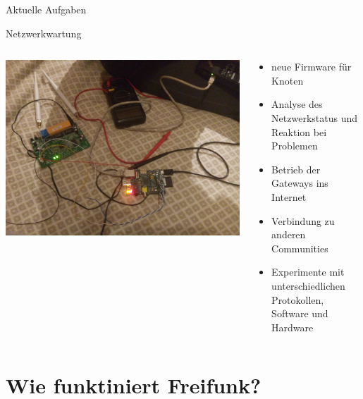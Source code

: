 \documentclass[handout, 10pt]{beamer}
\begin{document}
\begin{frame}{Aktuelle Aufgaben}
	\begin{center}
		\large Netzwerkwartung
		\vfill
	\end{center}
	\begin{columns}[T]
		\begin{column}{5cm}
			\includegraphics[width=\textwidth]{images/disassemble}
		\end{column}
		\begin{column}{7cm}
			\begin{itemize}[<+->]
				\item neue Firmware für Knoten
				\item Analyse des Netzwerkstatus und Reaktion bei Problemen
				\item Betrieb der Gateways ins Internet
				\item Verbindung zu anderen Communities
				\item Experimente mit unterschiedlichen Protokollen, Software und Hardware
			\end{itemize}
		\end{column}
	\end{columns}
\end{frame}

\section{Wie funktiniert Freifunk?}
\end{document}
